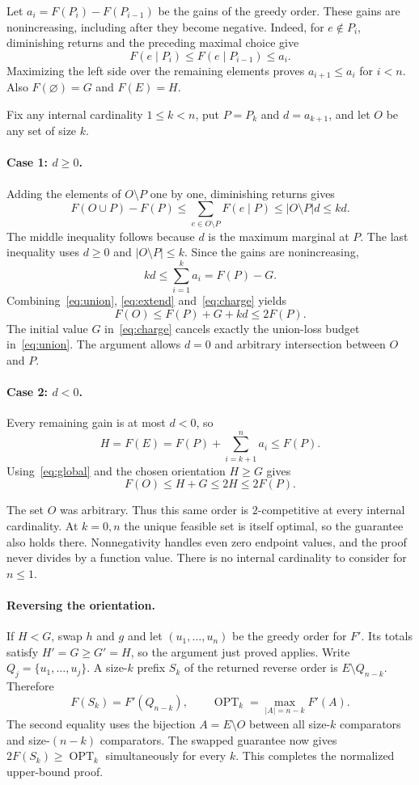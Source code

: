 \documentclass[acmsmall,screen,nonacm,11pt,natbib=false]{acmart}
\newcommand{\OPT}{\operatorname{OPT}}
\begin{document}
Let $a_i=F(P_i)-F(P_{i-1})$ be the gains of the greedy order. These gains
are nonincreasing, including after they become negative. Indeed, for
$e\notin P_i$, diminishing returns and the preceding maximal choice give
\[
 F(e\mid P_i)\le F(e\mid P_{i-1})\le a_i.
\]
Maximizing the left side over the remaining elements proves
$a_{i+1}\le a_i$ for $i<n$. Also $F(\varnothing)=G$ and $F(E)=H$.

Fix any internal cardinality $1\le k<n$, put $P=P_k$ and $d=a_{k+1}$,
and let $O$ be any set of size $k$.

\paragraph{Case 1: $d\ge0$.}
Adding the elements of $O\setminus P$ one by one, diminishing returns gives
\begin{equation}\label{eq:extend}
 F(O\cup P)-F(P)
 \le\sum_{e\in O\setminus P}F(e\mid P)
 \le |O\setminus P|d\le kd.
\end{equation}
The middle inequality follows because $d$ is the maximum marginal at $P$.
The last inequality uses $d\ge0$ and $|O\setminus P|\le k$.
Since the gains are nonincreasing,
\begin{equation}\label{eq:charge}
 kd\le\sum_{i=1}^k a_i=F(P)-G.
\end{equation}
Combining~\eqref{eq:union}, \eqref{eq:extend} and~\eqref{eq:charge} yields
\[
 F(O)\le F(P)+G+kd\le 2F(P).
\]
The initial value $G$ in~\eqref{eq:charge} cancels exactly the union-loss
budget in~\eqref{eq:union}. The argument allows $d=0$ and arbitrary
intersection between $O$ and $P$.

\paragraph{Case 2: $d<0$.}
Every remaining gain is at most $d<0$, so
\[
 H=F(E)=F(P)+\sum_{i=k+1}^{n}a_i\le F(P).
\]
Using~\eqref{eq:global} and the chosen orientation $H\ge G$ gives
\[
 F(O)\le H+G\le2H\le2F(P).
\]

The set $O$ was arbitrary. Thus this same order is $2$-competitive at every
internal cardinality. At $k=0,n$ the unique feasible set is itself optimal,
so the guarantee also holds there. Nonnegativity handles even zero endpoint
values, and the proof never divides by a function value. There is no internal
cardinality to consider for $n\le1$.

\paragraph{Reversing the orientation.}
If $H<G$, swap $h$ and $g$ and let $(u_1,\ldots,u_n)$ be the greedy order
for $F'$. Its totals satisfy $H'=G\ge G'=H$, so the argument just proved
applies. Write $Q_j=\{u_1,\ldots,u_j\}$. A size-$k$ prefix $S_k$ of
the returned reverse order is $E\setminus Q_{n-k}$. Therefore
\[
 F(S_k)=F'(Q_{n-k}),\qquad
 \OPT_k=\max_{|A|=n-k}F'(A).
\]
The second equality uses the bijection $A=E\setminus O$ between all
size-$k$ comparators and size-$(n-k)$ comparators. The swapped guarantee
now gives $2F(S_k)\ge\OPT_k$ simultaneously for every $k$.
This completes the normalized upper-bound proof.
\end{document}
